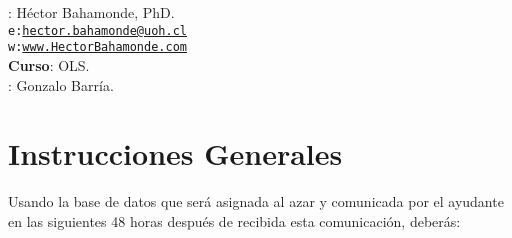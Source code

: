 \documentclass[10pt]{article}
\begin{document}


\thispagestyle{fancy} %





\hspace{-5mm}{\bf Profesor}: H\'ector Bahamonde, PhD.\\
\texttt{e:}\href{mailto:hector.bahamonde@uoh.cl}{\texttt{hector.bahamonde@uoh.cl}}\\
\texttt{w:}\href{http://www.hectorbahamonde.com}{\texttt{www.HectorBahamonde.com}}\\
{\bf Curso}: OLS.\\
\hspace{-5mm}{\bf TA}: Gonzalo Barr\'ia.


\vspace{-0.8cm}
\section*{Instrucciones Generales}

Usando la base de datos que ser\'a asignada al azar y comunicada por el ayudante en las siguientes 48 horas despu\'es de recibida esta comunicaci\'on, deber\'as:
\end{document}

